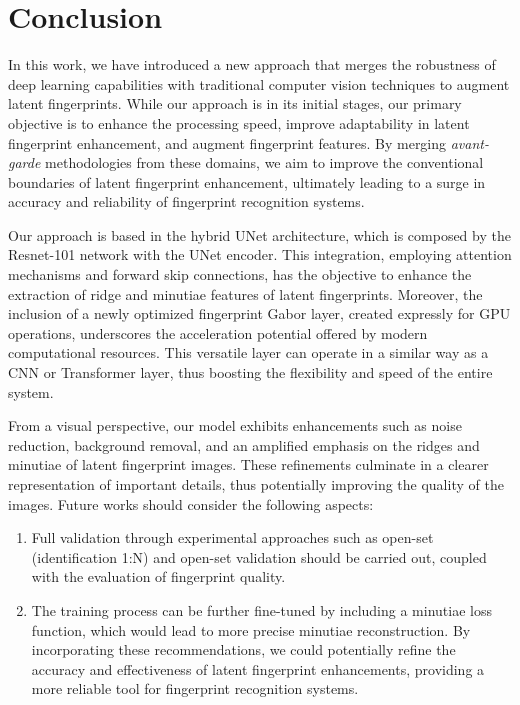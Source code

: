 \documentclass[twocolumn, switch]{article} %
\begin{document}
\vspace{-0.25cm}
\section{Conclusion}

In this work, we have introduced a new approach that merges the robustness of deep learning capabilities with traditional computer vision techniques to augment latent fingerprints. While our approach is in its initial stages, our primary objective is to enhance the processing speed, improve adaptability in latent fingerprint enhancement, and augment fingerprint features. By merging \textit{avant-garde} methodologies from these domains, we aim to improve the conventional boundaries of latent fingerprint enhancement, ultimately leading to a surge in accuracy and reliability of fingerprint recognition systems.

Our approach is based in the hybrid UNet architecture, which is composed by the Resnet-101 network with the UNet encoder. This integration, employing attention mechanisms and forward skip connections, has the objective to enhance the extraction of ridge and minutiae features of latent fingerprints. Moreover, the inclusion of a newly optimized fingerprint Gabor layer, created expressly for GPU operations, underscores the acceleration potential offered by modern computational resources. This versatile layer can operate in a similar way as a CNN or Transformer layer, thus boosting the flexibility and speed of the entire system.

From a visual perspective, our model exhibits enhancements such as noise reduction, background removal, and an amplified emphasis on the ridges and minutiae of latent fingerprint images. These refinements culminate in a clearer representation of important details, thus potentially improving the quality of the images. Future works should consider the following aspects:
\begin{enumerate}[noitemsep]
    \item Full validation through experimental approaches such as open-set (identification 1:N) and open-set validation should be carried out, coupled with the evaluation of fingerprint quality.
    \item The training process can be further fine-tuned by including a minutiae loss function, which would lead to more precise minutiae reconstruction. By incorporating these recommendations, we could potentially refine the accuracy and effectiveness of latent fingerprint enhancements, providing a more reliable tool for fingerprint recognition systems.
\end{enumerate}
\vspace{-0.45cm}
\end{document}
